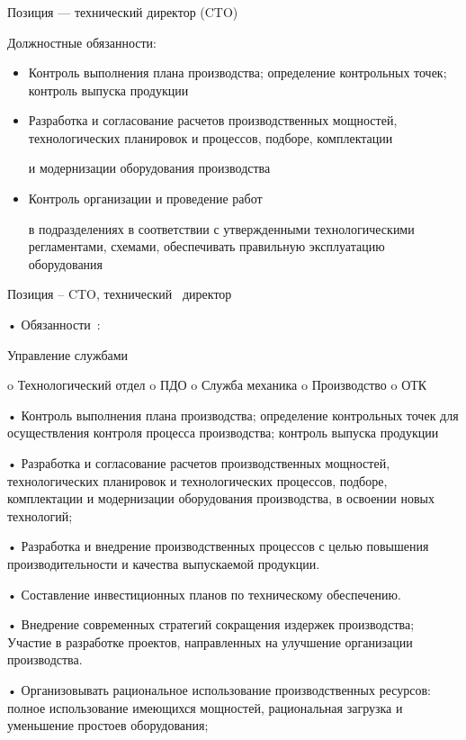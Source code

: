 \documentclass{../industrial-development}
\begin{document}
\begin{frame} \frametitle{}
 \begin{block}{}
  \alert{Позиция --- технический директор (CTO)}

Должностные обязанности: 
  \end{block}
  \begin{itemize}
  \item Контроль выполнения плана производства; определение контрольных точек; контроль выпуска продукции 
  \item Разработка и согласование расчетов производственных мощностей, технологических планировок и процессов, подборе, комплектации 

и модернизации оборудования производства
 \item Контроль организации и проведение работ 

в  подразделениях в соответствии с утвержденными технологическими регламентами, схемами, обеспечивать правильную эксплуатацию оборудования 
  \end{itemize}
\end{frame}

\lecturenotes

Позиция – CTO, технический~\cite{hh} директор~\cite{itcf}

•	Обязанности~\cite{rab}:

Управление службами

o	Технологический отдел
o	ПДО
o	Служба механика
o	Производство
o	ОТК

•	Контроль выполнения плана производства; определение контрольных точек для осуществления контроля процесса производства; контроль выпуска продукции

•	Разработка и согласование расчетов производственных мощностей, технологических планировок и технологических процессов, подборе, комплектации и модернизации оборудования производства, в освоении новых технологий;

•	Разработка и внедрение производственных процессов с целью повышения производительности и качества выпускаемой продукции.

•	Составление инвестиционных планов по техническому обеспечению.

•	Внедрение современных стратегий сокращения издержек производства; Участие в разработке проектов, направленных на улучшение организации производства.

•	Организовывать рациональное использование производственных ресурсов: полное использование имеющихся мощностей, рациональная загрузка и уменьшение простоев оборудования;
\end{document}
